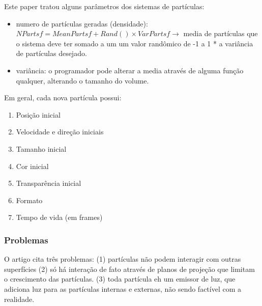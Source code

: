 Este paper tratou alguns parâmetros dos sistemas de partículas:
\begin{itemize}
\item numero de partículas geradas (densidade): $NPartsf = MeanPartsf + Rand() \times VarPartsf \rightarrow$ media de partículas que o sistema deve ter somado a um um valor randômico de -1 a 1 * a variância de partículas desejado. 
\item variância: o programador pode alterar a media através de alguma função qualquer, alterando o tamanho do volume.
\end{itemize}

Em geral, cada nova partícula possui: 

\begin{enumerate}
  \setlength{\itemsep}{0.05em}
\item Posição inicial
\item Velocidade e direção iniciais
\item Tamanho inicial
\item Cor inicial
\item Transparência inicial
\item Formato
\item Tempo de vida (em frames)
\end{enumerate}

\subsubsection{Problemas}
O artigo cita três problemas: (1) partículas não podem interagir com outras superfícies (2) só há interação de fato através de planos de projeção que limitam o crescimento das partículas. (3) toda partícula eh um emissor de luz, que adiciona luz para as partículas internas e externas, não sendo factível com a realidade.
